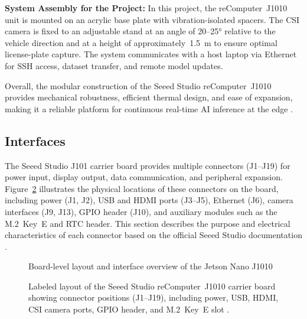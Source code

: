\bigskip
\textbf{System Assembly for the Project:}  
In this project, the reComputer~J1010 unit is mounted on an acrylic base plate with vibration-isolated spacers.  
The \ac{CSI} camera is fixed to an adjustable stand at an angle of 20–25° relative to the vehicle direction and at a height of approximately~1.5~m to ensure optimal license-plate capture.  
The system communicates with a host laptop via Ethernet for SSH access, dataset transfer, and remote model updates.

\bigskip
Overall, the modular construction of the Seeed Studio reComputer~J1010 provides mechanical robustness, efficient thermal design, and ease of expansion, making it a reliable platform for continuous real-time \ac{AI} inference at the edge \cite{seeedJ101Manual, edgeAIbook}.

\newpage
\subsection{Interfaces}
\label{sec:interfaces}
The Seeed Studio J101 carrier board provides multiple connectors (J1--J19) for power input, display output, data communication, and peripheral expansion.  
Figure~\ref{fig:interfaces_layout} illustrates the physical locations of these connectors on the board, including power (J1, J2), \ac{USB} and \ac{HDMI} ports (J3--J5), Ethernet (J6), camera interfaces (J9, J13), \ac{GPIO} header (J10), and auxiliary modules such as the M.2~Key~E and RTC header.  
This section describes the purpose and electrical characteristics of each connector based on the official Seeed Studio documentation \cite{seeedJ101Manual,reComputer_HardwareLayout}.


\bigskip



\begin{figure}[h!]
	\centering
	
	\caption{Board-level layout and interface overview of the Jetson Nano J1010 {\setlength{\fboxrule}{1.25pt}\setlength{\fboxsep}{0.75pt}}}
	\label{fig:interfaces_layout_oversight}
\end{figure}

\bigskip
\def \globalscale {0.400000}

\begin{figure}[h!]
	\centering
	
	\caption{Labeled layout of the Seeed Studio reComputer~J1010 carrier board showing connector positions (J1--J19), including power, \ac{USB}, \ac{HDMI}, \ac{CSI} camera ports, \ac{GPIO} header, and M.2~Key~E slot {\setlength{\fboxrule}{1.25pt}\setlength{\fboxsep}{0.75pt}}.}
	\label{fig:interfaces_layout}
\end{figure}
\bigskip




